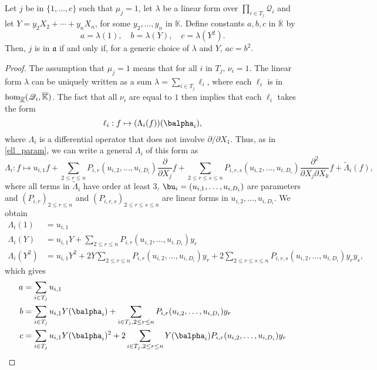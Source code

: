 \documentclass[12pt]{article}
\newcommand{\mf}{Y}
\newcommand{\residueI}{\mathscr{Q}}
\def\K{\mathbb{K}}
\def\K {\ensuremath{\mathbb{K}}}
\def\Kbar {{\ensuremath{\overline{\mathbb{K}}}}}
\begin{document}
\begin{lemma}\label{lemma:acb2}
  Let $j$ be in $\{1,\dots,c\}$ such that $\mu_j=1$, let $\lambda$ be
  a linear form over $\prod_{i \in T_j} \residueI_i$ and let $\mf=y_2
  X_2 + \cdots + y_n X_n$, for some $y_2,\dots,y_n$ in $\K$. Define constants
  $a,b,c$ in $\Kbar$ by
  $$a=\lambda(1),\quad b=\lambda(\mf),\quad c=\lambda(\mf^2).$$
  Then, $j$ is in $\mathfrak{a}$
  if and only if, for a generic choice of $\lambda$ and $\mf$, $ac=b^2$.
\end{lemma}
\begin{proof}
  The assumption that $\mu_j=1$ means that for all $i$ in $T_j$,
  $\nu_i=1$. The linear 
  form $\lambda$ can be uniquely written as a sum $\lambda=\sum_{i \in T_j}
  \ell_i$, where each $\ell_i$ is in ${\rm hom}_\Kbar(\residueI_i,\Kbar)$.
  The fact that all $\nu_i$ are equal to $1$ then implies that each $\ell_i$ takes the form 
  $$\ell_i: f \mapsto (\Lambda_{i}(f))(\balpha_i),$$
  where $\Lambda_{i}$ is a differential operator that does not 
  involve $\partial/\partial X_1$. Thus, as in \cref{ell_param}, we can write a general
  $\Lambda_i$ of this form as
  $$\Lambda_i: f \mapsto u_{i,1} f + \sum_{2 \le r \le n}
  P_{i,r}(u_{i,2},\dots,u_{i,D_i}) \frac{\partial}{\partial X_j} f +
  \sum_{2 \le r \le s \le n} P_{i,r,s}(u_{i,2},\dots,u_{i,D_i})
  \frac{\partial^2}{\partial X_j\partial X_k} f +
  \tilde\Lambda_i(f),$$ where all terms in $\tilde \Lambda_i$ have
  order at least $3$, $\bu_i=(u_{i,1},\dots,u_{i,D_i})$ are parameters and
  $(P_{i,r})_{2 \le r \le n}$ and $(P_{i,r,s})_{2 \le r \le s \le n}$
  are linear forms in $u_{i,2},\dots,u_{i,D_i}$.
  We obtain
  \begin{align*}
    \Lambda_i(1)   &= u_{i,1} \\
    \Lambda_i(\mf)   &= u_{i,1} \mf +\sum_{2 \le r \le n}P_{i,r}(u_{i,2},\dots,u_{i,D_i})y_r \\
    \Lambda_i(\mf^2) &= u_{i,1} \mf^2  +2 \mf \sum_{2 \le r \le n}P_{i,r}(u_{i,2},\dots,u_{i,D_i})y_r + 
    2\sum_{2 \le r \le s \le n} P_{i,r,s}(u_{i,2},\dots,u_{i,D_i})y_ry_s,
  \end{align*}
  which gives
  \begin{align*}
    a  &= \sum_{i\in T_j}u_{i,1} \\
    b  &= \sum_{i\in T_j}u_{i,1} \mf(\balpha_i) +\sum_{i \in T_j, 2 \le r \le n}P_{i,r}(u_{i,2},\dots,u_{i,D_i})y_r \\
    c &= \sum_{i\in T_j}u_{i,1} \mf(\balpha_i)^2  +2  \sum_{i \in T_j, 2 \le r \le n}\mf(\balpha_i) P_{i,r}(u_{i,2},\dots,u_{i,D_i})y_r    

\end{align*}
\end{proof}
\end{document}
